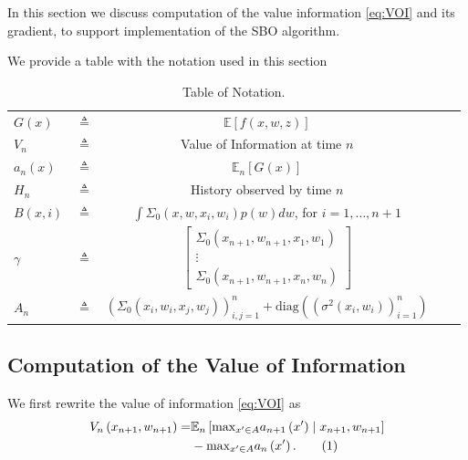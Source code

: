 \documentclass{article}
\newcommand{\w}{w}
\newcommand{\z}{z}
\newcommand\numberthis{\addtocounter{equation}{1}\tag{\theequation}}
\begin{document}
In this section we discuss computation of the value information \eqref{eq:VOI} and its gradient, to support implementation of the SBO algorithm.

We provide a table with the notation used in this section
\begin{table}[htbp]
\caption{Table of Notation.}
\label{table}
\centering
\vskip 0.2in
\begin{center}
\begin{small}
\begin{tabular}{lcccr}
\hline
$G(x)$ & $\triangleq$ & $\mathbb{E}[f(x,\w,\z)]$ \\
$V_{n}$ & $\triangleq$ & Value of Information at time $n$\\
$a_{n}\left(x\right)$ & $\triangleq$ & $\mathbb{E}_{n}\left[G(x) \right]$\\
$H_{n}$ & $\triangleq$ & History observed by time $n$\\
$B\left(x,i\right)$ & $\triangleq$ &  $\int\Sigma_{0}\left(x,\w,x_{i},\w_{i}\right)p(\w)d\w$, for $i=1,\ldots,n+1$\\
\belowspace
$\gamma$ & $\triangleq$ & $\left[\begin{array}{c}
\Sigma_{0}\left(x_{n+1},\w_{n+1},x_{1},\w_{1}\right)\\
\vdots\\
\Sigma_{0}\left(x_{n+1},\w_{n+1},x_{n},\w_{n}\right)
\end{array}\right]$\\
\belowspace
$A_{n}$ & $\triangleq$ & $\left(\Sigma_{0}\left(x_{i},w_{i},x_{j},w_{j}\right)\right)_{i,j=1}^{n} + \mbox{diag}\left(\left(\sigma^{2}\left(x_{i},w_{i}\right)\right)_{i=1}^{n}\right) $ \\
\hline
\end{tabular}
\end{small}
\end{center}
\vskip -0.1in
\end{table}

\subsection{Computation of the  Value of Information} 

We first rewrite the value of information \eqref{eq:VOI} as
\begin{align*}
V_{n}\left(x_{n+1},\w_{n+1}\right) =&\mathbb{E}_{n}\left[\mbox{max}_{x'\in A}a_{n+1}\left(x'\right) \mid x_{n+1},\w_{n+1}\right] \\
&-\mbox{max}_{x' \in A} a_{n}\left(x'\right). \numberthis 
\label{eq:VOI_a}
\end{align*}
\end{document}
